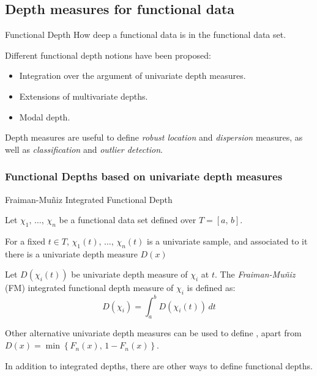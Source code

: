 \subsection{Depth measures for functional data}

\begin{definition}{Functional Depth}{}
    How deep a functional data is in the functional data set.

    Different functional depth notions have been proposed:
    \begin{itemize}
        \item Integration over the argument of univariate depth measures.
        \item Extensions of multivariate depths.
        \item Modal depth.
    \end{itemize}
    \tcblower
    Depth measures are useful to define \emph{robust location} and \emph{dispersion} measures,
    as well as \emph{classification} and \emph{outlier detection}.
\end{definition}

\subsubsection{Functional Depths based on univariate depth measures}

\begin{definition}{Fraiman-Muñiz Integrated Functional Depth}{}

Let $\chi_1,\, \dots,\, \chi_n$ be a functional data set defined over
$T = [a,\,b]$.

For a fixed $t \in T$, $\chi_1(t),\, \dots,\, \chi_n(t)$ is a univariate sample,
and associated to it there is a univariate depth measure $D(x)$

Let $D(\chi_i(t))$ be univariate depth measure of $\chi_i$ at $t$.
The \emph{Fraiman-Muñiz} (FM) integrated functional depth measure of
$\chi_i$ is defined as:
\begin{equation*}
    D(\chi_i) = \int_a^b D(\chi_i(t)) \, dt \tag{FM depth}
\end{equation*}
\tcblower
\begin{note}
    Other alternative univariate depth measures can be used to define ,
    apart from $D(x) = \min\left\{ F_n(x),\, 1 - F_n(x) \right\}$.
\end{note}
\begin{note}
    In addition to integrated depths, there are other ways to define functional depths.
\end{note}
\end{definition}

